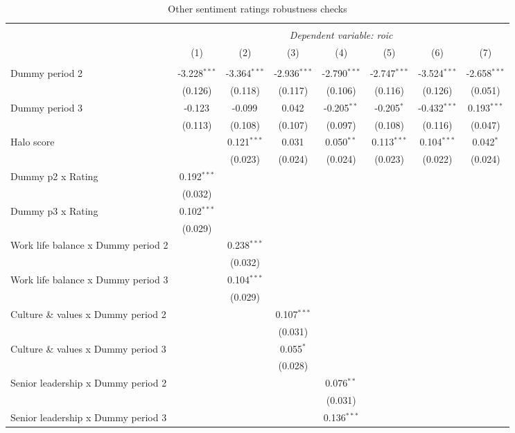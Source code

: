 \begin{table}[!htbp] \centering
  \caption{Other sentiment ratings robustness checks}
\begin{tabular}{@{\extracolsep{5pt}}lccccccc}
\\[-1.8ex]\hline
\hline \\[-1.8ex]
& \multicolumn{7}{c}{\textit{Dependent variable: roic}} \
\cr \cline{2-8}
\\[-1.8ex] & (1) & (2) & (3) & (4) & (5) & (6) & (7) \\
\hline \\[-1.8ex]
 Dummy period 2 & -3.228$^{***}$ & -3.364$^{***}$ & -2.936$^{***}$ & -2.790$^{***}$ & -2.747$^{***}$ & -3.524$^{***}$ & -2.658$^{***}$ \\
& (0.126) & (0.118) & (0.117) & (0.106) & (0.116) & (0.126) & (0.051) \\
 Dummy period 3 & -0.123$^{}$ & -0.099$^{}$ & 0.042$^{}$ & -0.205$^{**}$ & -0.205$^{*}$ & -0.432$^{***}$ & 0.193$^{***}$ \\
& (0.113) & (0.108) & (0.107) & (0.097) & (0.108) & (0.116) & (0.047) \\
 Halo score & & 0.121$^{***}$ & 0.031$^{}$ & 0.050$^{**}$ & 0.113$^{***}$ & 0.104$^{***}$ & 0.042$^{*}$ \\
& & (0.023) & (0.024) & (0.024) & (0.023) & (0.022) & (0.024) \\
 Dummy p2 x Rating & 0.192$^{***}$ & & & & & & \\
& (0.032) & & & & & & \\
 Dummy p3 x Rating & 0.102$^{***}$ & & & & & & \\
& (0.029) & & & & & & \\
 Work life balance x Dummy period 2 & & 0.238$^{***}$ & & & & & \\
& & (0.032) & & & & & \\
 Work life balance x Dummy period 3 & & 0.104$^{***}$ & & & & & \\
& & (0.029) & & & & & \\
 Culture \& values x Dummy period 2 & & & 0.107$^{***}$ & & & & \\
& & & (0.031) & & & & \\
 Culture \& values x Dummy period 3 & & & 0.055$^{*}$ & & & & \\
& & & (0.028) & & & & \\
 Senior leadership x Dummy period 2 & & & & 0.076$^{**}$ & & & \\
& & & & (0.031) & & & \\
 Senior leadership x Dummy period 3 & & & & 0.136$^{***}$ & & & \\

\end{tabular}
\end{table}
